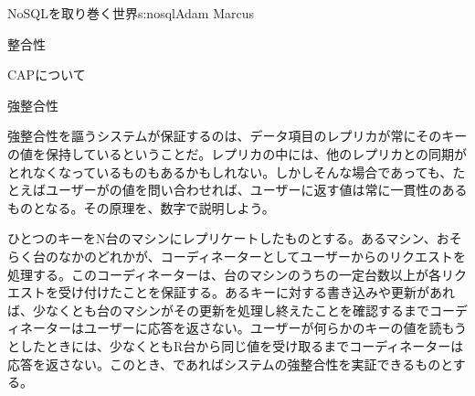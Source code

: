 \begin{aosachapter}{NoSQLを取り巻く世界}{s:nosql}{Adam Marcus}
\begin{aosasect1}{整合性}
\begin{aosasect2}{CAPについて}
\end{aosasect2}

\begin{aosasect2}{強整合性}

強整合性を謳うシステムが保証するのは、データ項目のレプリカが常にそのキーの値を保持しているということだ。レプリカの中には、他のレプリカとの同期がとれなくなっているものもあるかもしれない。しかしそんな場合であっても、たとえばユーザーがの値を問い合わせれば、ユーザーに返す値は常に一貫性のあるものとなる。その原理を、数字で説明しよう。

ひとつのキーをN台のマシンにレプリケートしたものとする。あるマシン、おそらく台のなかのどれかが、コーディネーターとしてユーザーからのリクエストを処理する。このコーディネーターは、台のマシンのうちの一定台数以上が各リクエストを受け付けたことを保証する。あるキーに対する書き込みや更新があれば、少なくとも台のマシンがその更新を処理し終えたことを確認するまでコーディネーターはユーザーに応答を返さない。ユーザーが何らかのキーの値を読もうとしたときには、少なくともR台から同じ値を受け取るまでコーディネーターは応答を返さない。このとき、であればシステムの強整合性を実証できるものとする。


\end{aosasect2}
\end{aosasect1}
\end{aosachapter}
